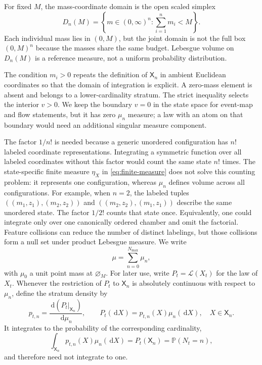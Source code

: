 \documentclass[10pt]{article}
\theoremstyle{definition}
\theoremstyle{remark}
\newcommand{\Pp}{\mathbb{P}}
\newcommand{\dd}{\,\mathrm{d}}
\newcommand{\emptyconfig}{\varnothing_M}
\newcommand{\state}{\mathsf{X}}
\begin{document}
For fixed $M$, the mass-coordinate domain is the open scaled simplex
\begin{equation}
  D_n(M)=\left\{m\in(0,\infty)^n:\sum_{i=1}^n m_i<M\right\}.
  \label{eq:mass-domain}
\end{equation}
Each individual mass lies in $(0,M)$, but the joint domain is not the full
box $(0,M)^n$ because the masses share the same budget.  Lebesgue volume on
$D_n(M)$ is a reference measure, not a uniform probability distribution.

The condition $m_i>0$ repeats the definition of $\state_n$ in ambient
Euclidean coordinates so that the domain of integration is explicit.  A
zero-mass element is absent and belongs to a lower-cardinality stratum.  The
strict inequality selects the interior $v>0$.  We keep the boundary $v=0$
in the state space for event-map and flow statements, but it has zero
$\mu_n$ measure; a law with an atom on that boundary would need an additional
singular measure component.

The factor $1/n!$ is needed because a generic unordered configuration has
$n!$ labeled coordinate representations.  Integrating a symmetric function
over all labeled coordinates without this factor would count the same state
$n!$ times.  The state-specific finite measure $\eta_X$ in
\eqref{eq:finite-measure} does not solve this counting problem: it represents
one configuration, whereas $\mu_n$ defines volume across all configurations.
For example, when $n=2$, the labeled tuples
$((m_1,z_1),(m_2,z_2))$ and
$((m_2,z_2),(m_1,z_1))$ describe the same unordered state.  The factor
$1/2!$ counts that state once.  Equivalently, one could integrate only over
one canonically ordered chamber and omit the factorial.
Feature collisions can reduce the number of distinct labelings, but those
collisions form a null set under product Lebesgue measure.  We write
\begin{equation}
  \mu=\sum_{n=0}^{N_{\max}}\mu_n,
\end{equation}
with $\mu_0$ a unit point mass at $\emptyconfig$.  For later use, write
$P_t=\mathcal L(X_t)$ for the law of $X_t$.  Whenever the restriction of
$P_t$ to $\state_n$ is absolutely continuous with respect to $\mu_n$, define
the stratum density by
\begin{equation}
  p_{t,n}
  =\frac{\dd(P_t|_{\state_n})}{\dd\mu_n},
  \qquad
  P_t(\dd X)=p_{t,n}(X)\mu_n(\dd X),
  \quad X\in\state_n.
  \label{eq:stratum-density}
\end{equation}
It integrates to the probability of the corresponding cardinality,
\begin{equation}
  \int_{\state_n}p_{t,n}(X)\mu_n(\dd X)
  =P_t(\state_n)=\Pp(N_t=n),
  \label{eq:stratum-density-mass}
\end{equation}
and therefore need not integrate to one.
\end{document}
